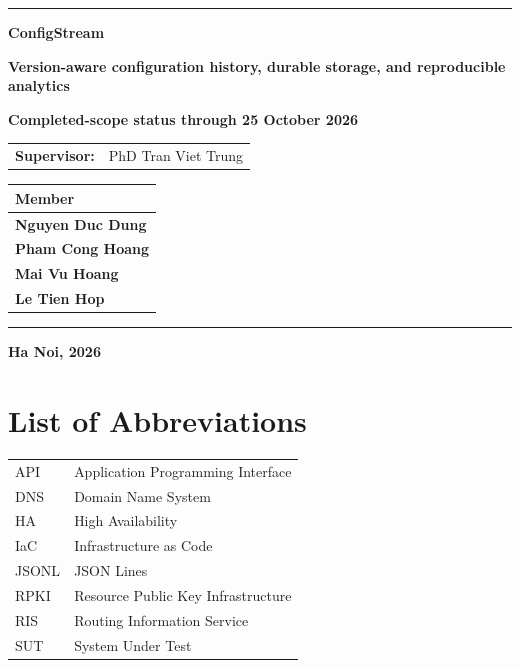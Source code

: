 \documentclass[a4paper,11pt]{article}
\begin{document}
\begin{titlepage}
\begin{center}
\vspace{0.15cm}
{\color{ConfigGold}\rule{7cm}{1pt}\par}
\vspace{0.3cm}
{\fontsize{22}{27}\selectfont\color{ConfigBlue}\textbf{ConfigStream}\par}
\vspace{0.18cm}
{\large\textbf{Version-aware configuration history, durable storage, and reproducible analytics}\par}
\vspace{0.25cm}
{\small\color{ConfigGray}\textbf{Completed-scope status through 25 October 2026}\par}
\vfill
\begin{minipage}{0.80\textwidth}
\renewcommand{\arraystretch}{1.15}
\begin{tabularx}{\linewidth}{@{}>{\bfseries}lX@{}}
Supervisor: & PhD Tran Viet Trung \\
\end{tabularx}
\end{minipage}
\vfill
\begin{minipage}{0.80\textwidth}
\small
\begin{tabularx}{\linewidth}{@{}>{\bfseries}X@{}}
\toprule
Member \\\midrule
Nguyen Duc Dung \\
Pham Cong Hoang \\
Mai Vu Hoang \\
Le Tien Hop \\
\bottomrule
\end{tabularx}
\end{minipage}
\vspace{0.55cm}
{\color{ConfigGold}\rule{5cm}{0.8pt}\par}
\vspace{0.15cm}
{\large\color{ConfigBlue}\textbf{Ha Noi, 2026}\par}
\end{center}
\end{titlepage}

\tableofcontents
\clearpage
\listoftables
\clearpage
\listoffigures
\clearpage

\section*{List of Abbreviations}
\begin{tabularx}{\textwidth}{@{}p{}X@{}}
    API & Application Programming Interface \\
    DNS & Domain Name System \\
    HA & High Availability \\
    IaC & Infrastructure as Code \\
    JSONL & JSON Lines \\
    RPKI & Resource Public Key Infrastructure \\
    RIS & Routing Information Service \\
    SUT & System Under Test \\
\end{tabularx}
\clearpage
\end{document}

